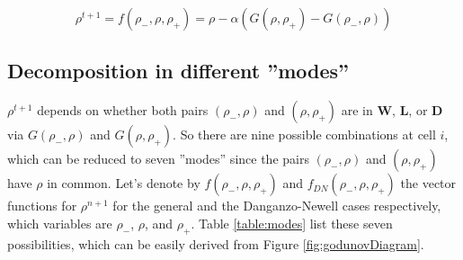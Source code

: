 \documentclass[11pt]{article}
\numberwithin{equation}{section}
\numberwithin{figure}{section}
\numberwithin{table}{section}
\begin{document}
\begin{equation} \label{eq:rhoGodunov2}
\rho^{t+1} = f(\rho_{-},\rho,\rho_{+}) = \rho - \alpha\left(G(\rho,\rho_{+})-G(\rho_{-},\rho)\right)
\end{equation}

\subsection{Decomposition in different ''modes''}\label{sec:decompositionModes}

$\rho^{t+1}$ depends on whether both pairs $(\rho_{-}, \rho)$ and $(\rho, \rho_{+})$ are in \textbf{W}, \textbf{L}, or \textbf{D} via $G(\rho_{-},\rho)$ and $G(\rho,\rho_{+})$. So there are nine possible combinations at cell $i$, which can be reduced to seven ''modes'' since the pairs $(\rho_{-}, \rho)$ and $(\rho, \rho_{+})$ have $\rho$ in common. Let's denote by $f(\rho_{-},\rho,\rho_{+})$ and $f_{DN}(\rho_{-},\rho,\rho_{+})$ the vector functions for $\rho^{n+1}$ for the general and the Danganzo-Newell cases respectively, which variables are $\rho_{-}$, $\rho$, and $\rho_{+}$. Table \ref{table:modes} list these seven possibilities, which can be easily derived from Figure \ref{fig:godunovDiagram}.
\end{document}
